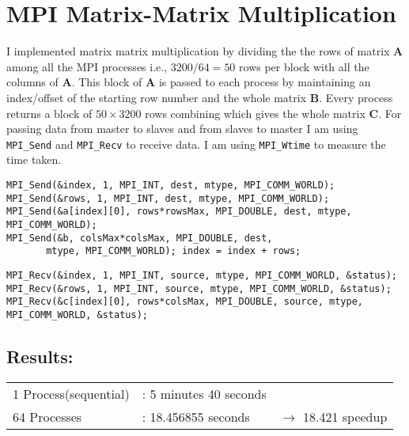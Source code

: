 \documentclass[12pt, letterpaper]{article}
\begin{document}
\section{MPI Matrix-Matrix Multiplication}

I implemented matrix matrix multiplication by dividing the the rows of matrix \textbf{A} among all the MPI processes i.e., $3200/64 = 50$ rows per block with all the columns of \textbf{A}. This block of \textbf{A} is passed to each process by maintaining an index/offset of the starting row number and the whole matrix \textbf{B}. Every process returns a block of $50 \times 3200$ rows combining which gives the whole matrix \textbf{C}. For passing data from master to slaves and from slaves to master I am using \verb~MPI_Send~ and \verb~MPI_Recv~ to receive data.
I am using \verb~MPI_Wtime~ to measure the time taken.

\begin{verbatim}
MPI_Send(&index, 1, MPI_INT, dest, mtype, MPI_COMM_WORLD);
MPI_Send(&rows, 1, MPI_INT, dest, mtype, MPI_COMM_WORLD);
MPI_Send(&a[index][0], rows*rowsMax, MPI_DOUBLE, dest, mtype, MPI_COMM_WORLD);
MPI_Send(&b, colsMax*colsMax, MPI_DOUBLE, dest,
       mtype, MPI_COMM_WORLD); index = index + rows;
\end{verbatim}

\begin{verbatim}
MPI_Recv(&index, 1, MPI_INT, source, mtype, MPI_COMM_WORLD, &status);
MPI_Recv(&rows, 1, MPI_INT, source, mtype, MPI_COMM_WORLD, &status);
MPI_Recv(&c[index][0], rows*colsMax, MPI_DOUBLE, source, mtype, 
MPI_COMM_WORLD, &status);
\end{verbatim}

\subsection{Results:}
\begin{tabular}{@{$\bullet$ }lll}
  1 Process(sequential)  &: 5 minutes 40 seconds &\\
  64 Processes           &: 18.456855 seconds &$\rightarrow$ 18.421 speedup\\
\end{tabular}
\end{document}
